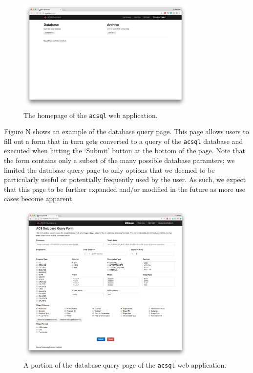\documentclass[10pt,journal,compsoc]{IEEEtran}
\begin{document}
\begin{figure}[!t]
\centering
\includegraphics[width=3.5in]{./figures/homepage.png}
\caption{The homepage of the \texttt{acsql} web application.}
\label{fig1}
\end{figure}

Figure N shows an example of the database query page.  This page allows users to fill out a form that
in turn gets converted to a query of the \texttt{acsql} database and executed when hitting the
`Submit' button at the bottom of the page.  Note that the form contains only a subset of the
many possible database paramters; we limited the database query page to only options that we deemed
to be particularly useful or potentially frequently used by the user.  As such, we expect that this
page to be further expanded and/or modified in the future as more use cases become apparent.

\begin{figure}[!t]
\centering
\includegraphics[width=3.5in]{./figures/database_query_page.png}
\caption{A portion of the database query page of the \texttt{acsql} web application.}
\label{fig1}
\end{figure}
\end{document}
